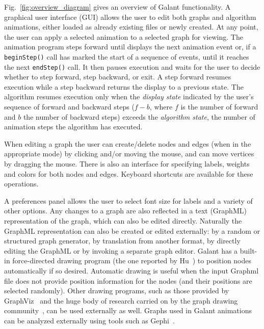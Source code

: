

Fig.~\ref{fig:overview_diagram} gives an overview of Galant functionality.
A graphical user interface (GUI) allows the user to edit both graphs and
algorithm animations, either loaded as already existing files or newly
created. At any point, the user can apply a selected animation to a selected
graph for viewing.
The animation program 
steps forward until
displays the next animation event or, if a \texttt{beginStep()}
call has marked the start of a sequence of events, until
it reaches the next \texttt{endStep()} call.
It then pauses execution and waits for the user to decide whether to
step forward, step backward, or exit.
A step forward resumes execution while a step backward returns the display to a previous
state.
The algorithm resumes execution only when the \emph{display state}
indicated by the user's sequence of forward and backward steps
($f-b$, where $f$ is the number of forward and $b$ the number of backward steps)
exceeds the \emph{algorithm state}, the number of animation steps the algorithm
has executed.

When editing a graph the user can create/delete nodes and edges (when in the appropriate mode)
by clicking and/or
moving the mouse, and can move vertices by dragging the mouse.
There is also an interface for specifying labels, weights and colors for both
nodes and edges.
Keyboard shortcuts are available for these operations.
 
A preferences panel allows the user to select font size for labels and a
variety of other options.
Any changes to a graph are also reflected in a text (GraphML) representation
of the graph, which can also be edited directly. Naturally the GraphML
representation can also be created or edited externally: by a random or
structured graph generator, by translation from another format, by directly
editing the GraphML or by invoking a separate graph editor.
Galant has a built-in force-directed drawing program 
(the one reported by Hu~\cite{2006-Mathematica-Hu}) to position nodes
automatically if so desired.
Automatic drawing is useful when the input Graphml file does not provide position
information for the nodes (and their positions are selected randomly).
Other drawing programs, such as those provided by GraphViz~\cite{GraphViz}
and the huge body of research carried on by the graph drawing community~\cite{graph_drawing},
can be used externally as well.
Graphs used in Galant animations
can be analyzed externally using tools such as Gephi~\cite{gephi}.

